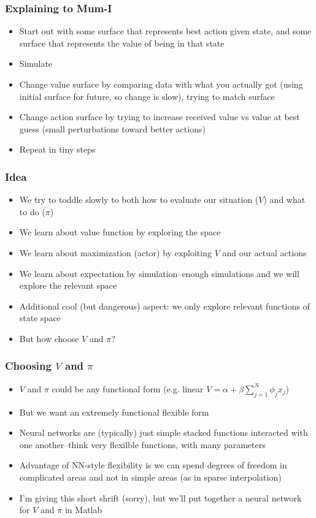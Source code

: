 \documentclass{beamer}
\begin{document}
\begin{frame}
\frametitle[alignment=center]{Explaining to Mum-I}
\begin{itemize}
\item Start out with some surface that represents best action given state, and some surface that represents the value of being in that state
\bigskip
\item Simulate
\bigskip
\item Change value surface by comparing data with what you actually got (using initial surface for future, so change is slow), trying to match surface
\bigskip
\item Change action surface by trying to  increase received value vs value at best guess (small perturbations toward better actions)
\bigskip
\item Repeat in tiny steps
\end{itemize}
\end{frame}


\begin{frame}
\frametitle[alignment=center]{Idea}
\begin{itemize}
\item We try to toddle slowly to both how to evaluate our situation ($V$) and what to do ($\pi$)
\bigskip
\item We learn about value function by exploring the space
\bigskip
\item We learn about maximization (actor) by exploiting $V$ and our actual actions
\bigskip
\item We learn about expectation by simulation--enough simulations and we will explore the relevant space
\bigskip
\item Additional cool (but dangerous) aspect: we only explore relevant functions of state space
\bigskip
\item But how choose $V$ and $\pi$?
\end{itemize}
\end{frame}

\begin{frame}
\frametitle[alignment=center]{Choosing $V$ and $\pi$}
\begin{itemize}
\item $V$ and $\pi$ could be any functional form (e.g. linear $V=\alpha+\beta\sum_{j=1}^N\phi_jx_{j}$)
\bigskip
\item But we want an extremely functional flexible form
\bigskip
\item Neural networks are (typically) just simple stacked functions interacted with one another--think very flexilble functions, with many parameters
\bigskip
\item Advantage of NN-style flexibility is we can spend degrees of freedom in complicated areas and not in simple areas (as in sparse interpolation)
\bigskip
\item I'm giving this short shrift (sorry), but we'll put together a neural network for $V$ and $\pi$ in Matlab
\end{itemize}
\end{frame}
\end{document}
